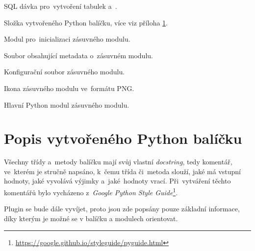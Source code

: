 \begin{description}
\begin{description}[leftmargin=1cm]
\begin{description}[leftmargin=1cm]
SQL dávka pro~vytvoření tabulek  a~.
		\end{description}
	\end{description}
	\item[\texttt{pubin}:] Složka vytvořeného Python balíčku, více
viz příloha \ref{popis_python_balicku}.
	\item[\texttt{\detokenize{__init__.py}}:] Modul
pro~inicializaci zásuvného modulu.
	\item[\texttt{metadata.txt}:] Soubor obsahující metadata
o~zásuvném modulu.
	\item[\texttt{puplugin.cfg}:] Konfigurační soubor zásuvného
modulu.
	\item[\texttt{puplugin.png}:] Ikona zásuvného modulu
ve~formátu PNG.
	\item[\texttt{puplugin.py}:] Hlavní Python modul zásuvného
modulu.
\end{description}

\chapter{Popis vytvořeného Python balíčku}
\label{popis_python_balicku}

Všechny třídy a~metody balíčku mají svůj vlastní \textit{docstring},
tedy komentář, ve~kterém je stručně napsáno, k~čemu třída či~metoda
slouží, jaké má vstupní hodnoty, jaké vyvolává výjimky a~jaké~hodnoty
vrací. Při~vytváření těchto komentářů bylo vycházeno z~\textit{Google
  Python Style
  Guide}\footnote{\url{https://google.github.io/styleguide/pyguide.html}}.

Plugin se bude dále vyvíjet, proto jsou zde popsány pouze základní
informace, díky kterým je možné se v balíčku a modulech orientovat.

\bigskip

\begin{minipage}{0.9\textwidth}
\end{minipage}

